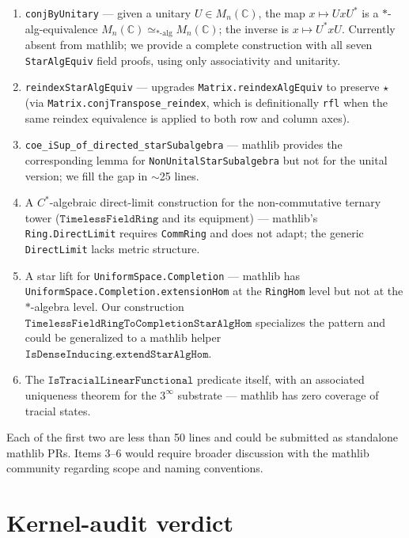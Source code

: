 \documentclass[11pt,a4paper]{article}
\theoremstyle{plain}
\theoremstyle{definition}
\begin{document}
\begin{enumerate}[leftmargin=*]
  \item \texttt{conjByUnitary} --- given a unitary $U \in M_n(\mathbb{C})$, the map $x \mapsto U x U^{\ast}$ is a $\ast$-alg-equivalence $M_n(\mathbb{C}) \simeq_{\ast\text{-alg}} M_n(\mathbb{C})$; the inverse is $x \mapsto U^{\ast} x U$. Currently absent from mathlib; we provide a complete construction with all seven \texttt{StarAlgEquiv} field proofs, using only associativity and unitarity.
  \item \texttt{reindexStarAlgEquiv} --- upgrades \texttt{Matrix.reindexAlgEquiv} to preserve $\star$ (via \texttt{Matrix.conjTranspose\_reindex}, which is definitionally \texttt{rfl} when the same reindex equivalence is applied to both row and column axes).
  \item \texttt{coe\_iSup\_of\_directed\_starSubalgebra} --- mathlib provides the corresponding lemma for \texttt{NonUnitalStarSubalgebra} but not for the unital version; we fill the gap in $\sim$25 lines.
  \item A $C^{\ast}$-algebraic direct-limit construction for the non-commutative ternary tower ($\texttt{TimelessFieldRing}$ and its equipment) --- mathlib's \texttt{Ring.DirectLimit} requires \texttt{CommRing} and does not adapt; the generic \texttt{DirectLimit} lacks metric structure.
  \item A star lift for \texttt{UniformSpace.Completion} --- mathlib has \texttt{UniformSpace.Completion.extensionHom} at the \texttt{RingHom} level but not at the $\ast$-algebra level. Our construction $\texttt{TimelessFieldRingToCompletionStarAlgHom}$ specializes the pattern and could be generalized to a mathlib helper $\texttt{IsDenseInducing.extendStarAlgHom}$.
  \item The $\texttt{IsTracialLinearFunctional}$ predicate itself, with an associated uniqueness theorem for the $3^{\infty}$ substrate --- mathlib has zero coverage of tracial states.
\end{enumerate}

Each of the first two are less than 50 lines and could be submitted as standalone mathlib PRs. Items 3--6 would require broader discussion with the mathlib community regarding scope and naming conventions.

\section{Kernel-audit verdict}
\label{sec:audit}
\end{document}
